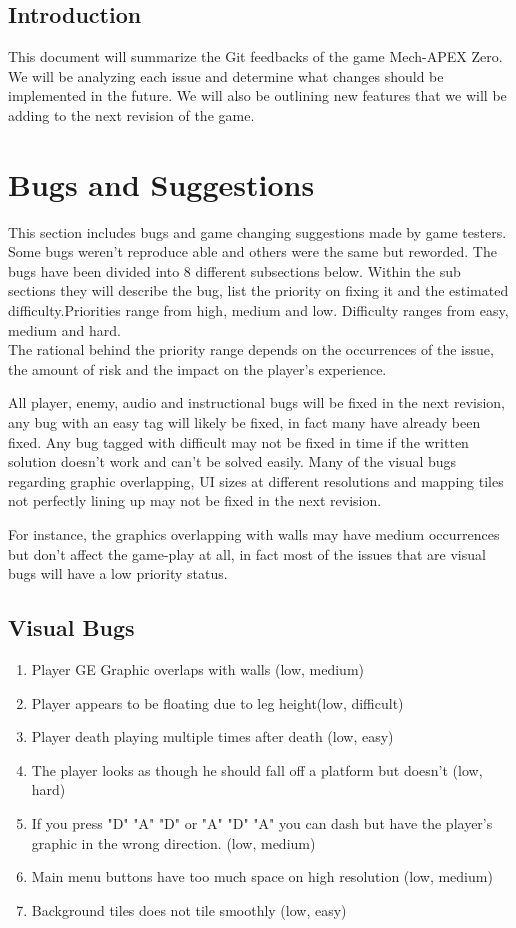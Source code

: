 \documentclass{article}
\begin{document}
\subsection*{Introduction}
This document will summarize the Git feedbacks of the game Mech-APEX Zero. We will be analyzing each issue and determine what changes should be implemented in the future. We will also be outlining new features that we will be adding to the next revision of the game.

\section*{Bugs and Suggestions}
This section includes bugs and game changing suggestions made by game testers. Some bugs weren't reproduce able and others were the same but reworded. The bugs have been divided into 8 different subsections below. Within the sub sections they will describe the bug, list the priority on fixing it and the estimated difficulty.Priorities range from high, medium and low. Difficulty ranges from easy, medium and hard.\\

The rational behind the priority range depends on the occurrences of the issue, the amount of risk and the impact on the player's experience. 

All player,  enemy, audio and instructional bugs will be fixed in the next revision, any bug with an easy tag will likely be fixed, in fact many have already been fixed. Any bug tagged with difficult may not be fixed in time if the written solution doesn't work  and can't be solved easily. Many of the visual bugs regarding  graphic overlapping, UI sizes at different resolutions and mapping tiles not perfectly lining up may not be fixed in the next revision.



For instance, the graphics overlapping with walls may have medium occurrences but don't affect the game-play at all, in fact most of the issues that are visual bugs will have a low priority status.  


\subsection*{Visual Bugs}
\begin{enumerate}
		\item Player GE Graphic overlaps with walls (low, medium)
		\item Player appears to be floating due to leg height(low, difficult)
		\item Player death playing multiple times after death (low, easy)
		\item The player looks as though he should fall off a platform but doesn't (low, hard)
		\item If you press "D" "A" "D" or "A" "D" "A" you can dash but have the player's graphic in the wrong  direction. (low, medium)
			\item Main menu  buttons have too much space on high resolution (low, medium)
				\item Background tiles does not tile smoothly (low, easy)
\end{enumerate}
\end{document}
